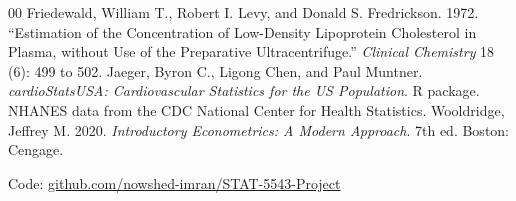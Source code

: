 \documentclass[preprint,letterpaper,11pt,authoryear]{elsarticle}
\begin{document}
\begin{thebibliography}{00}
 Friedewald, William T., Robert I. Levy, and Donald S. Fredrickson. 1972. ``Estimation of the Concentration of Low-Density Lipoprotein Cholesterol in Plasma, without Use of the Preparative Ultracentrifuge.'' \textit{Clinical Chemistry} 18 (6): 499 to 502.
 Jaeger, Byron C., Ligong Chen, and Paul Muntner. \textit{cardioStatsUSA: Cardiovascular Statistics for the US Population}. R package. NHANES data from the CDC National Center for Health Statistics.
 Wooldridge, Jeffrey M. 2020. \textit{Introductory Econometrics: A Modern Approach}. 7th ed. Boston: Cengage.
\end{thebibliography}

\vspace{6pt}
\noindent Code: \href{https://github.com/nowshed-imran/STAT-5543-Project}{github.com/nowshed-imran/STAT-5543-Project}
\end{document}
